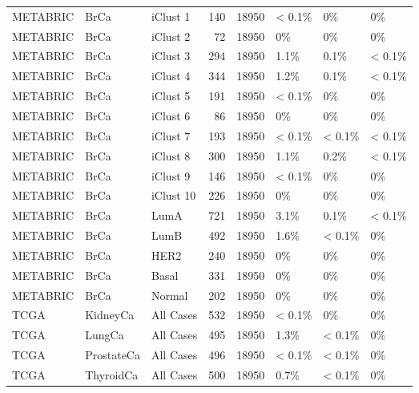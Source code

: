 \documentclass[]{article}
\begin{document}
\begin{table}[H]
{\begin{tabular}{lllrrlll}
\addlinespace
METABRIC & BrCa & iClust 1 & 140 & 18950 & < 0.1\% & 0\% & 0\%\\
METABRIC & BrCa & iClust 2 & 72 & 18950 & 0\% & 0\% & 0\%\\
METABRIC & BrCa & iClust 3 & 294 & 18950 & 1.1\% & 0.1\% & < 0.1\%\\
METABRIC & BrCa & iClust 4 & 344 & 18950 & 1.2\% & 0.1\% & < 0.1\%\\
METABRIC & BrCa & iClust 5 & 191 & 18950 & < 0.1\% & 0\% & 0\%\\
\addlinespace
METABRIC & BrCa & iClust 6 & 86 & 18950 & 0\% & 0\% & 0\%\\
METABRIC & BrCa & iClust 7 & 193 & 18950 & < 0.1\% & < 0.1\% & < 0.1\%\\
METABRIC & BrCa & iClust 8 & 300 & 18950 & 1.1\% & 0.2\% & < 0.1\%\\
METABRIC & BrCa & iClust 9 & 146 & 18950 & < 0.1\% & 0\% & 0\%\\
METABRIC & BrCa & iClust 10 & 226 & 18950 & 0\% & 0\% & 0\%\\
\addlinespace
METABRIC & BrCa & LumA & 721 & 18950 & 3.1\% & 0.1\% & < 0.1\%\\
METABRIC & BrCa & LumB & 492 & 18950 & 1.6\% & < 0.1\% & 0\%\\
METABRIC & BrCa & HER2 & 240 & 18950 & 0\% & 0\% & 0\%\\
METABRIC & BrCa & Basal & 331 & 18950 & 0\% & 0\% & 0\%\\
METABRIC & BrCa & Normal & 202 & 18950 & 0\% & 0\% & 0\%\\
\addlinespace
TCGA & KidneyCa & All Cases & 532 & 18950 & < 0.1\% & 0\% & 0\%\\
TCGA & LungCa & All Cases & 495 & 18950 & 1.3\% & < 0.1\% & 0\%\\
TCGA & ProstateCa & All Cases & 496 & 18950 & < 0.1\% & < 0.1\% & 0\%\\
TCGA & ThyroidCa & All Cases & 500 & 18950 & 0.7\% & < 0.1\% & 0\%\\
\bottomrule
\end{tabular}}
\end{table}
\end{document}
